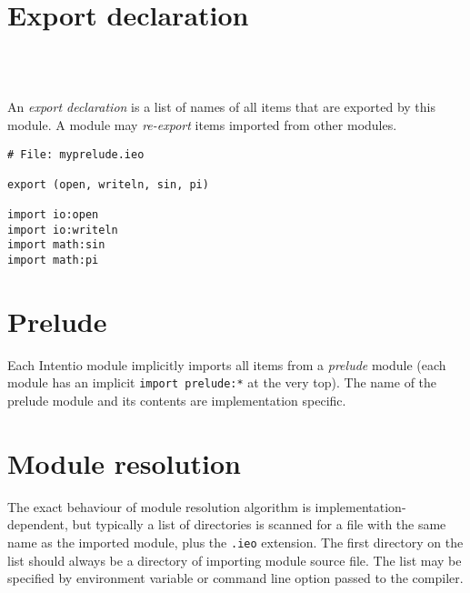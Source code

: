 \section{Export declaration}

\begin{bnf}
   \eq {} \ \term{(} \  \ \term{)} \\
   \eq {} \  \ \gtry{\term{,}}
\end{bnf}

An \emph{export declaration} is a list of names of all items that are exported by this module. A module may \emph{re-export} items imported from other modules.

\begin{example}[Re-exporting]
\begin{lstlisting}[language=intentio]
# File: myprelude.ieo

export (open, writeln, sin, pi)

import io:open
import io:writeln
import math:sin
import math:pi
\end{lstlisting}
\end{example}

\section{Prelude}

Each Intentio module implicitly imports all items from a \emph{prelude} module (each module has an implicit \lstinline{import prelude:*} at the very top). The name of the prelude module and its contents are implementation specific.

\section{Module resolution}

The exact behaviour of module resolution algorithm is implementation-dependent, but typically a list of directories is scanned for a file with the same name as the imported module, plus the \lstinline{.ieo} extension. The first directory on the list should always be a directory of importing module source file. The list may be specified by environment variable or command line option passed to the compiler.
